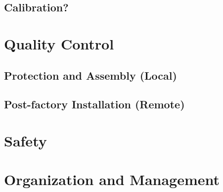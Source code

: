 \subsection{Calibration?}
\label{sec:fdsp-tpc-elec-install-calib}



\section{Quality Control}
\label{sec:fdsp-tpc-elec-qc}

\subsection{Protection and Assembly (Local)}
\label{sec:fdsp-tpc-elec-qc-local}


\subsection{Post-factory Installation (Remote)}
\label{sec:fdsp-tpc-elec-qc-remote}





\section{Safety}
\label{sec:fdsp-tpc-elec-safety}






\section{Organization and Management}
\label{sec:fdsp-tpc-elec-org}

